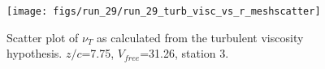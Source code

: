 \begin{figure}[H]
\centering
\texttt{[image: figs/run\_29/run\_29\_turb\_visc\_vs\_r\_meshscatter]}
\caption{Scatter plot of $\nu_T$ as calculated from the turbulent viscosity hypothesis. $z/c$=7.75, $V_{free}$=31.26, station 3.}
\label{fig:run_29_turb_visc_vs_r_meshscatter}
\end{figure}



